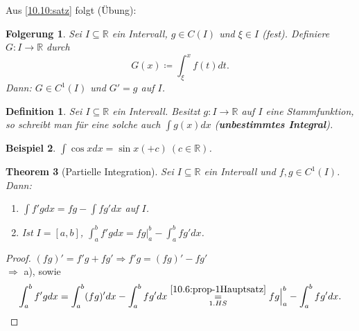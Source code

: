 \documentclass[titlepage,ngerman,a4paper,headsepline]{scrartcl}
\newcommand{\R}{\mathbb{R}}
\theoremstyle{named}
\newtheorem{namedtheorem}{Theorem} \counterwithin{namedtheorem}{section}
\theoremstyle{dotless}
\newtheorem{beispiel}[namedtheorem]{Beispiel}
\newtheorem{folgerung}[namedtheorem]{Folgerung}
\newtheorem*{definition}{Definition}
\begin{document}
Aus \ref{10.10:satz} folgt (Übung):

\begin{folgerung} \label{10.12:folg}
	Sei $I \subseteq \R$ ein Intervall, $g \in C(I)$ und $\xi \in I$ (fest). Definiere $G \colon I \rightarrow \R$ durch
	$$ G(x) \coloneqq \int_{\xi}^{x} f(t) dt. $$
	Dann: $G \in C^{1}(I)$ und $G' = g$ auf $I$.
\end{folgerung}

\begin{definition}
	Sei $I \subseteq \R$ ein Intervall. Besitzt $g \colon I \rightarrow \R$ auf $I$ eine Stammfunktion, so schreibt man für eine solche auch $\int g(x) dx$ (\textbf{unbestimmtes Integral}).
\end{definition}

\begin{beispiel} 
	$\int \cos x dx = \sin x ( + c) ~(c \in \R)$.
\end{beispiel}

\begin{namedtheorem}[Partielle Integration]
	Sei $I \subseteq \R$ ein Intervall und $f, g \in C^{1}(I)$. Dann:
	\begin{enumerate}
		\item $\int f' g dx = f g - \int f g' dx$ auf $I$.
		\item Ist $I = [a, b]$, $\int_{a}^{b} f' g dx = f g \Big|_{a}^{b} - \int_{a}^{b} f g' dx$.
	\end{enumerate}
\end{namedtheorem}

\begin{proof}
	$(f g)' = f' g + f g' \Rightarrow f' g = (fg)' - fg'$ \\
	$\Rightarrow$ a), sowie
		$$ \int_{a}^{b} f' g dx = \int_{a}^{b} (fg)' dx - \int_{a}^{b} fg' dx \overset{\ref{10.6:prop-1Hauptsatz}}{\underset{1. HS}{=}} fg \Big|_{a}^{b} - \int_{a}^{b} fg' dx. $$ 
\end{proof}
\end{document}
